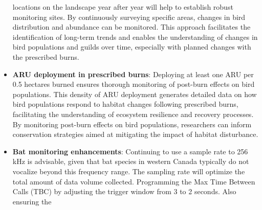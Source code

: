 \documentclass[
  letterpaper,
  DIV=11,
  numbers=noendperiod,
  oneside]{scrartcl}
\begin{document}
\begin{itemize}
  locations on the landscape year after year will help to establish
  robust monitoring sites. By continuously surveying specific areas,
  changes in bird distribution and abundance can be monitored. This
  approach facilitates the identification of long-term trends and
  enables the understanding of changes in bird populations and guilds
  over time, especially with planned changes with the prescribed burns.
\item
  \textbf{ARU deployment in prescribed burns}: Deploying at least one
  ARU per 0.5 hectares burned ensures thorough monitoring of post-burn
  effects on bird populations. This density of ARU deployment generates
  detailed data on how bird populations respond to habitat changes
  following prescribed burns, facilitating the understanding of
  ecosystem resilience and recovery processes. By monitoring post-burn
  effects on bird populations, researchers can inform conservation
  strategies aimed at mitigating the impact of habitat disturbance.
\item
  \textbf{Bat monitoring enhancements}: Continuing to use a sample rate
  to 256 kHz is advisable, given that bat species in western Canada
  typically do not vocalize beyond this frequency range. The sampling
  rate will optimize the total amount of data volume collected.
  Programming the Max Time Between Calls (TBC) by adjusting the trigger
  window from 3 to 2 seconds. Also ensuring the
\end{itemize}
\end{document}
